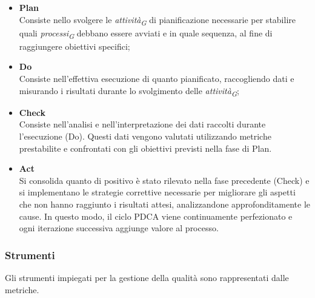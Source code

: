 \begin{itemize}
    \item \textbf{Plan} \\
    Consiste nello svolgere le \textit{attività}\textsubscript{\textit{G}} di pianificazione necessarie per stabilire quali \textit{processi}\textsubscript{\textit{G}} debbano essere avviati e in quale sequenza, al fine di raggiungere obiettivi specifici;
    \item \textbf{Do} \\
    Consiste nell'effettiva esecuzione di quanto pianificato, raccogliendo dati e misurando i risultati durante lo svolgimento delle \textit{attività}\textsubscript{\textit{G}};
    \item \textbf{Check} \\
    Consiste nell'analisi e nell'interpretazione dei dati raccolti durante l'esecuzione (Do). Questi dati vengono valutati utilizzando metriche prestabilite e confrontati con gli obiettivi previsti nella fase di Plan.
    \item \textbf{Act} \\
    Si consolida quanto di positivo è stato rilevato nella fase precedente (Check) e si implementano le strategie correttive necessarie per migliorare gli aspetti che non hanno raggiunto i risultati attesi, analizzandone approfonditamente le cause. In questo modo, il ciclo PDCA viene continuamente perfezionato e ogni iterazione successiva aggiunge valore al processo.
\end{itemize}

\subsubsection{Strumenti}
Gli strumenti impiegati per la gestione della qualità sono rappresentati dalle metriche.

